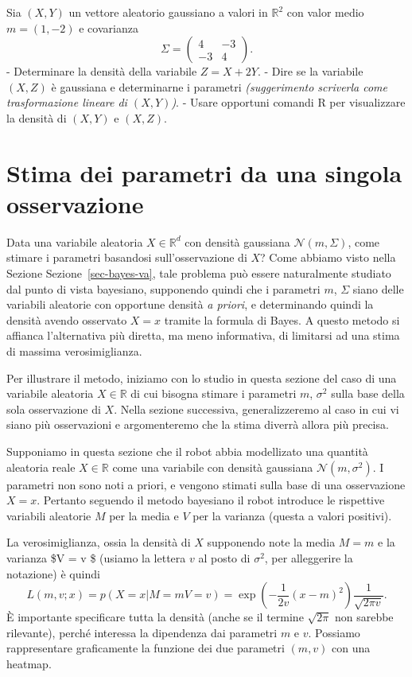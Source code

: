 \documentclass[
  italian,
  letterpaper,
]{book}
\newcommand{\bra}[1]{\left( #1 \right)}
\newcommand{\R}{\mathbb{R}}
\theoremstyle{definition}
\theoremstyle{remark}
\begin{document}
Sia \((X,Y)\) un vettore aleatorio gaussiano a valori in \(\R^2\) con
valor medio \(m =(1,-2)\) e covarianza
\[ \Sigma = \bra{ \begin{array}{cc} 4 & -3 \\ -3 & 4 \end{array} }.\] -
Determinare la densità della variabile \(Z = X+2Y\). - Dire se la
variabile \((X,Z)\) è gaussiana e determinarne i parametri
\emph{(suggerimento scriverla come trasformazione lineare di
\((X,Y)\))}. - Usare opportuni comandi R per visualizzare la densità di
\((X,Y)\) e \((X,Z)\).

\section{Stima dei parametri da una singola
osservazione}\label{sec-stima}

Data una variabile aleatoria \(X \in \R^d\) con densità gaussiana
\(\mathcal{N}(m, \Sigma)\), come stimare i parametri basandosi
sull'osservazione di \(X\)? Come abbiamo visto nella Sezione
Sezione~\ref{sec-bayes-va}, tale problema può essere naturalmente
studiato dal punto di vista bayesiano, supponendo quindi che i parametri
\(m\), \(\Sigma\) siano delle variabili aleatorie con opportune densità
\emph{a priori}, e determinando quindi la densità avendo osservato
\(X=x\) tramite la formula di Bayes. A questo metodo si affianca
l'alternativa più diretta, ma meno informativa, di limitarsi ad una
stima di massima verosimiglianza.

Per illustrare il metodo, iniziamo con lo studio in questa sezione del
caso di una variabile aleatoria \(X \in \R\) di cui bisogna stimare i
parametri \(m\), \(\sigma^2\) sulla base della sola osservazione di
\(X\). Nella sezione successiva, generalizzeremo al caso in cui vi siano
più osservazioni e argomenteremo che la stima diverrà allora più
precisa.

Supponiamo in questa sezione che il robot abbia modellizato una quantità
aleatoria reale \(X \in \R\) come una variabile con densità gaussiana
\(\mathcal{N}(m,\sigma^2)\). I parametri non sono noti a priori, e
vengono stimati sulla base di una osservazione \(X=x\). Pertanto
seguendo il metodo bayesiano il robot introduce le rispettive variabili
aleatorie \(M\) per la media e \(V\) per la varianza (questa a valori
positivi).

La verosimiglianza, ossia la densità di \(X\) supponendo note la media
\(M=m\) e la varianza \$V = v \$ (usiamo la lettera \(v\) al posto di
\(\sigma^2\), per alleggerire la notazione) è quindi
\[ L( m,v; x) = p(X =x | M=m V=v) = \exp\bra{ - \frac 1 {2 v} (x-m)^2 }\frac{1}{\sqrt{ 2 \pi v}}.\]
È importante specificare tutta la densità (anche se il termine
\(\sqrt{2 \pi}\) non sarebbe rilevante), perché interessa la dipendenza
dai parametri \(m\) e \(v\). Possiamo rappresentare graficamente la
funzione dei due parametri \((m,v)\) con una heatmap.
\end{document}
